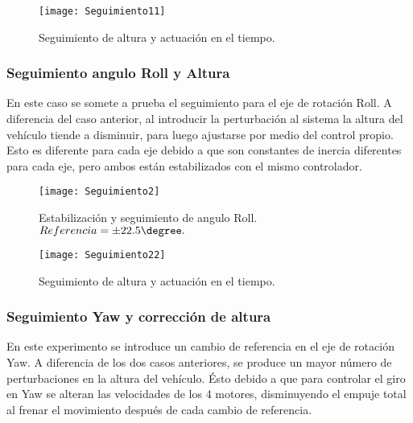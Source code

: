 \documentclass[\main/main.tex]{subfiles}
\begin{document}
\begin{figure}[H]
\noindent \begin{centering}
\texttt{[image: Seguimiento11]}
\par\end{centering}
\caption{Seguimiento de altura y actuación en el tiempo.}
\end{figure}

\subsubsection{Seguimiento angulo Roll y Altura}

En este caso se somete a prueba el seguimiento para el eje de rotación
Roll. A diferencia del caso anterior, al introducir la perturbación
al sistema la altura del vehículo tiende a disminuir, para luego ajustarse
por medio del control propio. Esto es diferente para cada eje debido
a que son constantes de inercia diferentes para cada eje, pero ambos
están estabilizados con el mismo controlador.

\begin{figure}[H]
\noindent \begin{centering}
\texttt{[image: Seguimiento2]}
\par\end{centering}
\caption{Estabilización y seguimiento de angulo Roll. $Referencia=\pm22.5\degree.$ }
\end{figure}

\begin{figure}[H]
\noindent \begin{centering}
\texttt{[image: Seguimiento22]}
\par\end{centering}
\caption{Seguimiento de altura y actuación en el tiempo.}
\end{figure}

\subsubsection{Seguimiento Yaw y corrección de altura}

En este experimento se introduce un cambio de referencia en el eje
de rotación Yaw. A diferencia de los dos casos anteriores, se produce
un mayor número de perturbaciones en la altura del vehículo. Ésto
debido a que para controlar el giro en Yaw se alteran las velocidades
de los 4 motores, disminuyendo el empuje total al frenar el movimiento
después de cada cambio de referencia.
\end{document}
